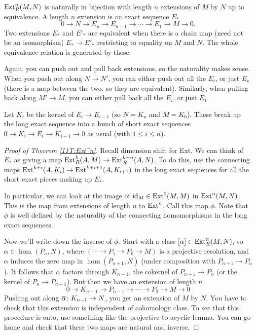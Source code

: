 \begin{theorem}\label{11T:Ext^n}
 $\operatorname{Ext}^n_R(M,N)$ is naturally in bijection with length $n$ extensions of $M$ by $N$ up to equivalence. A length $n$ extension is an exact sequence $E_*$
 \[
  0\to N\to E_n\to E_{n-1}\to \cdots \to E_1\to M\to 0.
 \]
 Two extensions $E_*$ and $E'_*$ are equivalent when there is a chain map (need not be an isomorphism) $E_*\to E'_*$ restricting to equality on $M$ and $N$. The whole equivalence relation is generated by these.
\end{theorem}
Again, you can push out and pull back extensions, so the naturality makes sense. When you push out along $N\to N'$, you can either push out all the $E_i$, or just $E_n$ (there is a map between the two, so they are equivalent). Similarly, when pulling back along $M'\to M$, you can either pull back all the $E_i$, or just $E_1$.

Let $K_i$ be the kernel of $E_i\to E_{i-1}$ (so $N=K_n$ and $M=K_0$). These break up the long exact sequence into a bunch of short exact sequences $0\to K_i\to E_i\to K_{i-1}\to 0$ as usual (with $1\le i\le n$).
\begin{proof}[Proof of Theorem \ref{11T:Ext^n}]
 Recall dimension shift for Ext. We can think of $E_*$ as giving a map $\operatorname{Ext}^k_R(A,M)\to \operatorname{Ext}^{k+n}_R(A,N)$. To do this, use the connecting maps $\operatorname{Ext}^{k+i}(A,K_i)\to \operatorname{Ext}^{k+i+1}(A,K_{i+1})$ in the long exact sequences for all the short exact pieces making up $E_*$.
 
 In particular, we can look at the image of $\operatorname{id}_M\in \operatorname{Ext}^0(M,M)$ in $\operatorname{Ext}^n(M,N)$. This is the map from extensions of length $n$ to $\operatorname{Ext}^n$. Call this map $\phi$. Note that $\phi$ is well defined by the naturality of the connecting homomorphisms in the long exact sequences.
 
 Now we'll write down the inverse of $\phi$. Start with a class $[\alpha]\in \operatorname{Ext}^n_R(M,N)$, so $\alpha\in \hom(P_n,N)$, where $(\cdots \to P_1\to P_0 \to M)$ is a projective resolution, and $\alpha$ induces the zero map in $\hom(P_{n+1},N)$ (under composition with $P_{n+1}\to P_n$). It follows that $\alpha$ factors through $K_{n-1}$, the cokernel of $P_{n+1}\to P_n$ (or the kernel of $P_n\to P_{n-1}$). But then we have an extension of length $n$
 \[
   0\to K_{n-1}\to P_{n-1}\to \cdots \to P_0\to M\to 0
 \]
 Pushing out along $\bbar\alpha\colon K_{n-1}\to N$, you get an extension of $M$ by $N$. You have to check that this extension is independent of cohomology class. To see that this procedure is onto, use something like the projective to acyclic lemma. You can go home and check that these two maps are natural and inverse.
\end{proof}

